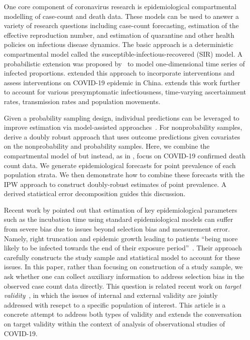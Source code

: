 \documentclass[11pt]{amsart}
\numberwithin{equation}{section}
\theoremstyle{plain}
\begin{document}
One core component of coronavirus research is epidemiological compartmental modelling of case-count and death data. These models can be used to answer a variety of research questions including case-count forecasting, estimation of the effective reproduction number, and estimation of quarantine and other health policies on infectious disease dynamics.  The basic approach is a deterministic compartmental model called the susceptible-infectious-recovered (SIR) model.  A probabilistic extension was proposed by~\cite{Osthus2017} to model one-dimensional time series of infected proportions. \cite{Song2020} extended this approach to incorporate interventions and assess interventions on COVID-19 epidemic in China. \cite{Hao2020} extends this work further to account for various presymptomatic infectiousness, time-varying ascertainment rates, transmission rates and population movements.

Given a probability sampling design, individual predictions can be leveraged to improve estimation via model-assisted approaches~\citep{Breidt2017}.  For nonprobability samples, \cite{Chen2019} derive a doubly robust approach that uses outcome predictions given covariates on the nonprobability and probability samples.  Here, we combine the compartmental model of \cite{Song2020} but instead, as in \cite{Johndrow2020}, focus on COVID-19 confirmed death count data.  We generate epidemiological forecasts for point prevalence of each population strata.  We then demonstrate how to combine these forecasts with the IPW approach to construct doubly-robust estimates of point prevalence.  A derived statistical error decomposition guides this discussion.

Recent work by \cite{Zhao2021} pointed out that estimation of key epidemiological parameters such as the incubation time using standard epidemiological models can suffer from severe bias due to issues beyond selection bias and measurement error.  Namely, right truncation and epidemic growth leading to patients ``being more likely to be infected towards the end of their exposure period''~\citep[pp. 3]{Zhao2021}.  Their approach carefully constructs the study sample and statistical model to account for these issues.  In this paper, rather than focusing on construction of a study sample, we ask whether one can collect auxiliary information to address selection bias in the observed case count data directly. This question is related recent work on \emph{target validity}~\citep{Westreich2018}, in which the issues of internal and external validity are jointly addressed  with resepct to a specific population of interest.  This article is a concrete attempt to address both types of validity and extends the conversation on target validity within the context of analysis of observational studies of COVID-19.
\end{document}
